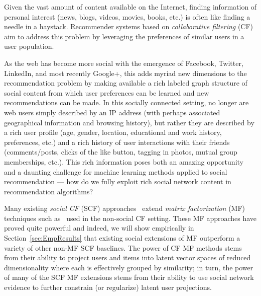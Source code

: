 Given the vast amount of content available on the Internet, finding
information of personal interest (news, blogs, videos, movies, books,
etc.) is often like finding a needle in a haystack.  Recommender
systems based on \emph{collaborative filtering}
(CF)~\cite{collab_filtering} aim to address this problem by 
leveraging the preferences of similar users in a user population.





As the web has become more social with the emergence of Facebook,
Twitter, LinkedIn, and most recently Google+, this adds myriad new
dimensions to the recommendation problem by making available a rich
labeled graph structure of social content from which user preferences
can be learned and new recommendations can be made.  In this socially
connected setting, no longer are web users simply described by an IP
address (with perhaps associated geographical information and browsing
history), but rather they are described by a rich user profile (age,
gender, location, educational and work history, preferences, etc.)
and a rich history of user interactions with their friends (comments/posts, 
clicks of the like button, tagging in photos, mutual group
memberships, etc.).  This rich information poses both an amazing
opportunity and a daunting challenge for machine learning methods
applied to social recommendation --- how do we fully exploit rich social
network content in recommendation algorithms?

Many existing \emph{social CF} (SCF)
approaches~\cite{ste,sorec,lla,socinf,sr,rrmf} extend \emph{matrix
factorization} (MF) techniques such as~\cite{pmf} used in the
non-social CF setting.  These MF approaches have proved quite powerful
and indeed, we will show empirically in Section~\ref{sec:EmpResults} 
that existing social extensions of MF outperform a variety of other
non-MF SCF baselines.  The power of CF MF methods stems from their
ability to project users and items into latent vector spaces of
reduced dimensionality where each is effectively grouped by
similarity; in turn, the power of many of the SCF MF extensions stems
from their ability to use social network evidence to further constrain
(or regularize) latent user projections.

